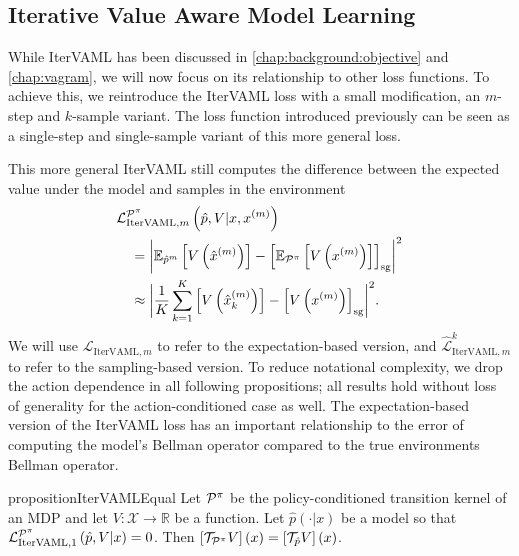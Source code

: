 \subsection{Iterative Value Aware Model Learning}

While IterVAML has been discussed in \autoref{chap:background:objective} and \autoref{chap:vagram}, we will now focus on its relationship to other loss functions.
To achieve this, we reintroduce the IterVAML loss with a small modification, an $m$-step and $k$-sample variant.
The loss function introduced previously can be seen as a single-step and single-sample variant of this more general loss.

This more general IterVAML still computes the difference between the expected value under the model and samples in the environment
\begin{equation}\label{eq:itervaml}
\begin{aligned}
     &{\mathcal{L}}^{\P^\pi}_{\mathrm{IterVAML}, m}\left(\hat{p},V|x, x^{(m)}\right) \\
    & \quad = \biggl|\mathbb{E}_{\hat{p}^m} \squareb{V\roundb{\hat{x}^{(m)}}} - 
    \squareb{\EEX{\P^\pi}{V\roundb{x^{(m)}}}}_\mathrm{sg}\biggr|^2 \\
    & \quad \approx \biggl|\frac{1}{K}\sum_{k=1}^K \squareb{V\roundb{\hat{x}_k^{(m)}}} - 
    \squareb{V\roundb{x^{(m)}}}_\mathrm{sg}\biggr|^2. 
\end{aligned}
\end{equation}
%
We will use $\mathcal{L}_{\mathrm{IterVAML}, m}$ to refer to the expectation-based version, and $\hat{\mathcal{L}}^k_{\mathrm{IterVAML}, m}$ to refer to the sampling-based version.
To reduce notational complexity, we drop the action dependence in all following propositions; all results hold without loss of generality for the action-conditioned case as well.
The expectation-based version of the IterVAML loss has an important relationship to the error of computing the model's Bellman operator compared to the true environments Bellman operator.

\begin{restatable}{proposition}{IterVAMLEqual}{\textcite{itervaml}}\label{prop:1_1}
    Let $\P^\pi$ be the policy-conditioned transition kernel of an MDP and let $V: \mathcal{X} \rightarrow \mathbb{R}$ be a function.
    Let $\hat{p}(\cdot|x)$ be a model so that ${\mathcal{L}}^{\P^\pi}_{\mathrm{IterVAML}, 1}\left(\hat{p},V|x\right) = 0$.
    Then $\squareb{\mathcal{T}_{\P^\pi} V }(x) = \squareb{\mathcal{T}_{\hat{p}} V }(x)$.
\end{restatable}

